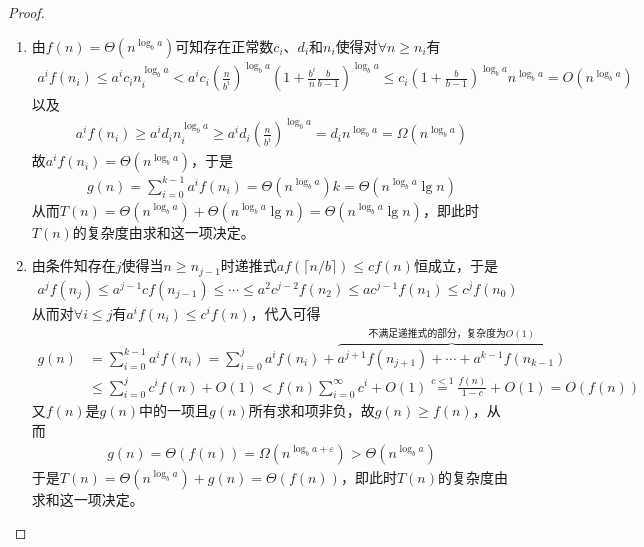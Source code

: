 \documentclass{ctexart}
\begin{document}
\begin{proof}
\begin{enumerate}
        \item 由$f(n) = \Theta (n^{\log_b a})$可知存在正常数$c_i$、$d_i$和$n_i$使得对$\forall n \ge n_i$有
              \begin{align*}
                  a^i f(n_i) \le a^i c_i n_i^{\log_b a} < a^i c_i \left( \frac{n}{b^i} \right)^{\log_b a} \left( 1 + \frac{b^i}{n} \frac{b}{b-1} \right)^{\log_b a} \le c_i \left( 1 + \frac{b}{b-1} \right)^{\log_b a} n^{\log_b a} = O(n^{\log_b a})
              \end{align*}
              以及
              \begin{align*}
                  a^i f(n_i) \ge a^i d_i n_i^{\log_b a} \ge a^i d_i \left( \frac{n}{b^i} \right)^{\log_b a} = d_i n^{\log_b a} = \Omega (n^{\log_b a})
              \end{align*}
              故$a^i f(n_i) = \Theta(n^{\log_b a})$，于是
              \begin{align*}
                  g(n) = \sum_{i=0}^{k-1} a^i f(n_i) = \Theta(n^{\log_b a}) k = \Theta(n^{\log_b a} \lg n)
              \end{align*}
              从而$T(n) = \Theta(n^{\log_b a}) + \Theta(n^{\log_b a} \lg n) = \Theta(n^{\log_b a} \lg n)$，即此时$T(n)$的复杂度由求和这一项决定。

        \item 由条件知存在$j$使得当$n \ge n_{j-1}$时递推式$a f(\lceil n/b \rceil) \le c f(n)$恒成立，于是
              \begin{align*}
                  a^j f(n_j) \le a^{j-1} c f(n_{j-1}) \le \cdots \le a^2 c^{j-2} f(n_2) \le a c^{j-1} f(n_1) \le c^j f(n_0)
              \end{align*}
              从而对$\forall i \le j$有$a^i f(n_i) \le c^{i} f(n)$，代入可得
              \begin{align*}
                  g(n) & = \sum_{i=0}^{k-1} a^i f(n_i) = \sum_{i=0}^j a^i f(n_i) + \overbrace{a^{j+1} f(n_{j+1}) + \cdots + a^{k-1} f(n_{k-1})}^{\text{不满足递推式的部分，复杂度为}O(1)} \\
                       & \le \sum_{i=0}^j c^i f(n) + O(1) < f(n) \sum_{i=0}^\infty c^i + O(1) \overset{c<1}{=} \frac{f(n)}{1-c} + O(1) = O(f(n))
              \end{align*}
              又$f(n)$是$g(n)$中的一项且$g(n)$所有求和项非负，故$g(n) \ge f(n)$，从而
              \begin{align*}
                  g(n) = \Theta (f(n)) = \Omega(n^{\log_b a + \varepsilon}) > \Theta(n^{\log_b a})
              \end{align*}
              于是$T(n) = \Theta(n^{\log_b a}) + g(n) = \Theta (f(n))$，即此时$T(n)$的复杂度由求和这一项决定。
    \end{enumerate}


\end{proof}
\end{document}
